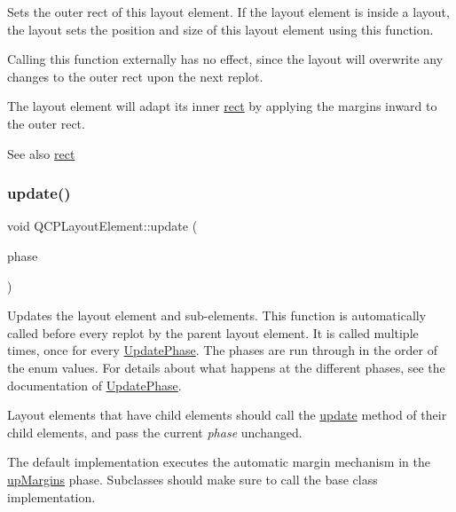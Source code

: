 Sets the outer rect of this layout element. If the layout element is inside a layout, the layout sets the position and size of this layout element using this function.

Calling this function externally has no effect, since the layout will overwrite any changes to the outer rect upon the next replot.

The layout element will adapt its inner \hyperlink{class_q_c_p_layout_element_a208effccfe2cca4a0eaf9393e60f2dd4}{rect} by applying the margins inward to the outer rect.

\begin{DoxySeeAlso}{See also}
\hyperlink{class_q_c_p_layout_element_a208effccfe2cca4a0eaf9393e60f2dd4}{rect} 
\end{DoxySeeAlso}
\hypertarget{class_q_c_p_layout_element_a929c2ec62e0e0e1d8418eaa802e2af9b}{}\label{class_q_c_p_layout_element_a929c2ec62e0e0e1d8418eaa802e2af9b} 
\subsubsection{\texorpdfstring{update()}{update()}}
{\footnotesize\ttfamily void Q\+C\+P\+Layout\+Element\+::update (\begin{DoxyParamCaption}\item[{\hyperlink{class_q_c_p_layout_element_a0d83360e05735735aaf6d7983c56374d}{Update\+Phase}}]{phase }\end{DoxyParamCaption})\hspace{0.3cm}{\ttfamily [virtual]}}

Updates the layout element and sub-\/elements. This function is automatically called before every replot by the parent layout element. It is called multiple times, once for every \hyperlink{class_q_c_p_layout_element_a0d83360e05735735aaf6d7983c56374d}{Update\+Phase}. The phases are run through in the order of the enum values. For details about what happens at the different phases, see the documentation of \hyperlink{class_q_c_p_layout_element_a0d83360e05735735aaf6d7983c56374d}{Update\+Phase}.

Layout elements that have child elements should call the \hyperlink{class_q_c_p_layout_element_a929c2ec62e0e0e1d8418eaa802e2af9b}{update} method of their child elements, and pass the current {\itshape phase} unchanged.

The default implementation executes the automatic margin mechanism in the \hyperlink{class_q_c_p_layout_element_a0d83360e05735735aaf6d7983c56374da288cb59a92280e47261a341f2813e676}{up\+Margins} phase. Subclasses should make sure to call the base class implementation. 


